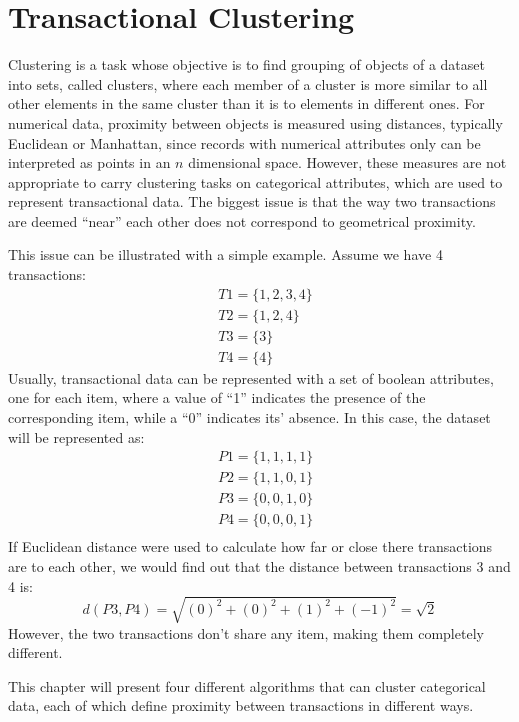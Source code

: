 \chapter{Transactional Clustering}

Clustering is a task whose objective is to find grouping of objects of a dataset into sets, called clusters, where each member of a cluster is more similar to all other elements in the same cluster than it is to elements in different ones. For numerical data, proximity between objects is measured using distances, typically Euclidean or Manhattan, since records with numerical attributes only can be interpreted as points in an $n$ dimensional space. However, these measures are not appropriate to carry clustering tasks on categorical attributes, which are used to represent transactional data. The biggest issue is that the way two transactions are deemed ``near'' each other does not correspond to geometrical proximity.

This issue can be illustrated with a simple example. Assume we have 4 transactions:
\begin{align*}
    &T1 = \{1,2,3,4\} \\
    &T2 = \{1,2,4\} \\
    &T3 = \{3\} \\
    &T4 = \{4\}
\end{align*}
Usually, transactional data can be represented with a set of boolean attributes, one for each item, where a value of ``1'' indicates the presence of the corresponding item, while a ``0'' indicates its' absence. In this case, the dataset will be represented as:
\begin{align*}
    &P1 = \{1,1,1,1\} \\
    &P2 = \{1,1,0,1\} \\
    &P3 = \{0,0,1,0\} \\
    &P4 = \{0,0,0,1\} \\
\end{align*}
If Euclidean distance were used to calculate how far or close there transactions are to each other, we would find out that the distance between transactions 3 and 4 is:
\begin{equation*}
    d(P3, P4) = \sqrt{(0)^2 + (0)^2 + (1)^2 + (-1)^2} = \sqrt{2}    
\end{equation*}
However, the two transactions don't share any item, making them completely different.

This chapter will present four different algorithms that can cluster categorical data, each of which define proximity between transactions in different ways.

